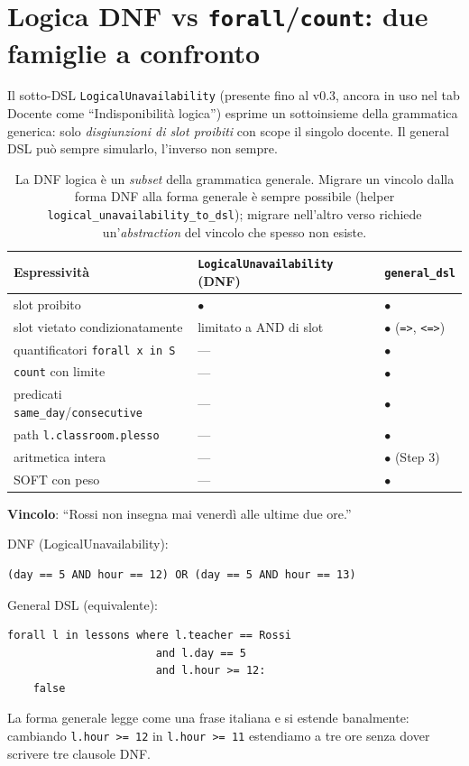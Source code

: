 \section{Logica DNF vs \texttt{forall}/\texttt{count}: due famiglie a confronto}
\label{sec:dsl-logic-vs-forall}

Il sotto-DSL \texttt{LogicalUnavailability} (presente fino al
v0.3, ancora in uso nel tab Docente come ``Indisponibilit\`a
logica'') esprime un sottoinsieme della grammatica generica:
solo \emph{disgiunzioni di slot proibiti} con scope il singolo
docente. Il general DSL pu\`o sempre simularlo, l'inverso non
sempre.

\begin{table}[h]
\centering
\sffamily\small
\begin{tabular}{p{3.6cm}p{4.2cm}p{4.2cm}}
\toprule
Espressivit\`a & \texttt{LogicalUnavailability} (DNF) & \texttt{general\_dsl} \\
\midrule
slot proibito & $\bullet$ & $\bullet$ \\
slot vietato condizionatamente & limitato a AND di slot & $\bullet$ (\texttt{=>}, \texttt{<=>}) \\
quantificatori \texttt{forall x in S} & --- & $\bullet$ \\
\texttt{count} con limite & --- & $\bullet$ \\
predicati \texttt{same\_day}/\texttt{consecutive} & --- & $\bullet$ \\
path \texttt{l.classroom.plesso} & --- & $\bullet$ \\
aritmetica intera & --- & $\bullet$ (Step 3) \\
SOFT con peso & --- & $\bullet$ \\
\bottomrule
\end{tabular}
\caption{La DNF logica \`e un \emph{subset} della grammatica
generale. Migrare un vincolo dalla forma DNF alla forma generale
\`e sempre possibile (helper
\texttt{logical\_unavailability\_to\_dsl}); migrare nell'altro
verso richiede un'\emph{abstraction} del vincolo che spesso non
esiste.}
\label{tab:dsl-vs-logic}
\end{table}

\begin{esempiobox}[title={Lo stesso vincolo, due grammatiche}]
\textbf{Vincolo}: ``Rossi non insegna mai venerd\`i alle ultime
due ore.''

DNF (LogicalUnavailability):
\begin{lstlisting}
(day == 5 AND hour == 12) OR (day == 5 AND hour == 13)
\end{lstlisting}

\noindent
General DSL (equivalente):
\begin{lstlisting}
forall l in lessons where l.teacher == Rossi
                       and l.day == 5
                       and l.hour >= 12:
    false
\end{lstlisting}

\noindent
La forma generale legge come una frase italiana e si estende
banalmente: cambiando \texttt{l.hour >= 12} in \texttt{l.hour >= 11}
estendiamo a tre ore senza dover scrivere tre clausole DNF.
\end{esempiobox}

